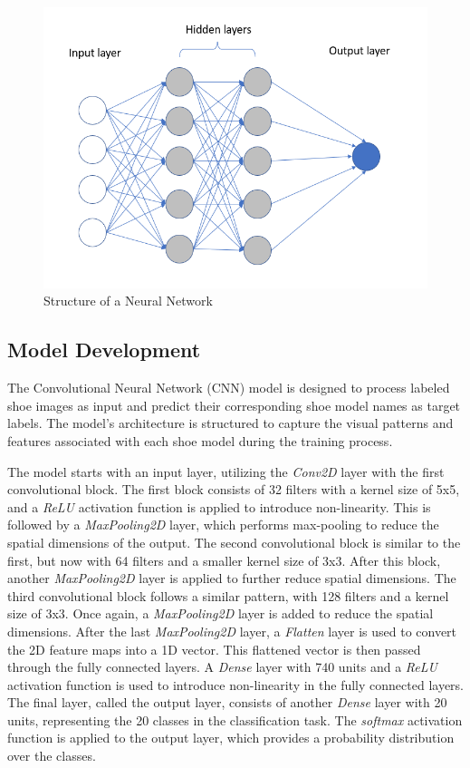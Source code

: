 \documentclass[11pt,a4paper]{article}
\begin{document}
 \begin{figure}[h!]
\centering
  \includegraphics[width=0.75\linewidth]{neural network.png}
  \caption{Structure of a Neural Network}
  \label{neural_network}
\end{figure}

\subsection{Model Development}
The Convolutional Neural Network (CNN) model is designed to process labeled shoe images as input and predict their corresponding shoe model names as target labels. The model's architecture is structured to capture the visual patterns and features associated with each shoe model during the training process.

The model starts with an input layer, utilizing the \emph{Conv2D} layer with the first convolutional block. The first block consists of 32 filters with a kernel size of 5x5, and a \emph{ReLU} activation function is applied to introduce non-linearity. This is followed by a \emph{MaxPooling2D} layer, which performs max-pooling to reduce the spatial dimensions of the output. The second convolutional block is similar to the first, but now with 64 filters and a smaller kernel size of 3x3. After this block, another \emph{MaxPooling2D} layer is applied to further reduce spatial dimensions. The third convolutional block follows a similar pattern, with 128 filters and a kernel size of 3x3. Once again, a \emph{MaxPooling2D} layer is added to reduce the spatial dimensions. After the last \emph{MaxPooling2D} layer, a \emph{Flatten} layer is used to convert the 2D feature maps into a 1D vector. This flattened vector is then passed through the fully connected layers. A \emph{Dense} layer with 740 units and a \emph{ReLU} activation function is used to introduce non-linearity in the fully connected layers. The final layer, called the output layer, consists of another \emph{Dense} layer with 20 units, representing the 20 classes in the classification task. The \emph{softmax} activation function is applied to the output layer, which provides a probability distribution over the classes.
\end{document}
